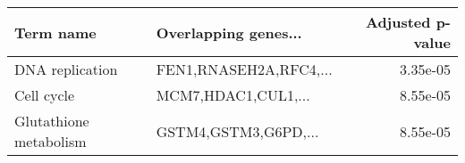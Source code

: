 \begin{tabular}{llr}
\toprule
             Term name &   Overlapping genes... &  Adjusted p-value \\
\midrule
       DNA replication & FEN1,RNASEH2A,RFC4,... &          3.35e-05 \\
            Cell cycle &    MCM7,HDAC1,CUL1,... &          8.55e-05 \\
Glutathione metabolism &   GSTM4,GSTM3,G6PD,... &          8.55e-05 \\
\bottomrule
\end{tabular}
